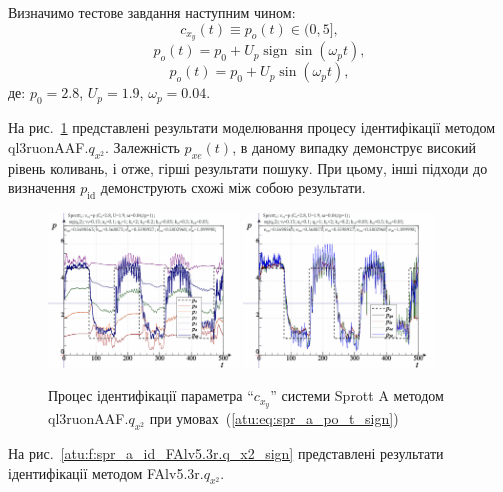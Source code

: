 \documentclass[a4paper,13pt]{atuaref}
\DeclareMathOperator*{\sign}{sign}
\begin{document}
Визначимо тестове завдання наступним чином:
\[
  c_{x_y}(t) \equiv p_o(t) \in (0, 5],
\]
%
\begin{equation}
  p_o(t) = p_0 +  U_{p} \sign \sin( \omega_{p} t ),
  \label{atu:eq:spr_a_po_t_sign}
\end{equation}
%
%
\begin{equation}
  p_o(t) = p_0 +  U_{p} \sin( \omega_{p} t ),
  \label{atu:eq:spr_a_po_t_sin}
\end{equation}
%
де:
$p_0 = 2.8$, $U_p=1.9$, $\omega_p=0.04$.

На рис.~\ref{atu:f:spr_a_id_ql3ruonAAF.q_x2_sign}
представлені результати моделювання процесу ідентифікації методом ql3ruonAAF.$q_{x^2} $.
Залежність $ p_{xe} (t) $, в даному випадку демонструє високий
рівень коливань, і отже, гірші результати пошуку. При цьому, інші підходи до
визначення $ p_\mathrm{id} $ демонструють схожі між собою результати.

\begin{figure}[ht!]
  \centerline{
    \includegraphics[width=0.45\textwidth]{p5/p/cha/spr_a/qAuv5.3r/sprott_a_qAuv5_3r_qx2-p_t_pi_sign.png}
    \hfill
    \includegraphics[width=0.45\textwidth]{p5/p/cha/spr_a/qAuv5.3r/sprott_a_qAuv5_3r_qx2-p_t_pz_sign.png}
  }
  \caption{Процес ідентифікації параметра ``$c_{x_y}$'' системи Sprott A методом ql3ruonAAF.$q_{x^2}$ при умовах~(\ref{atu:eq:spr_a_po_t_sign})}
  \label{atu:f:spr_a_id_ql3ruonAAF.q_x2_sign}
\end{figure}

На рис.~\ref{atu:f:spr_a_id_FAlv5.3r.q_x2_sign}
представлені результати ідентифікації методом
FAlv5.3r.$q_{x^2}$.
\end{document}

